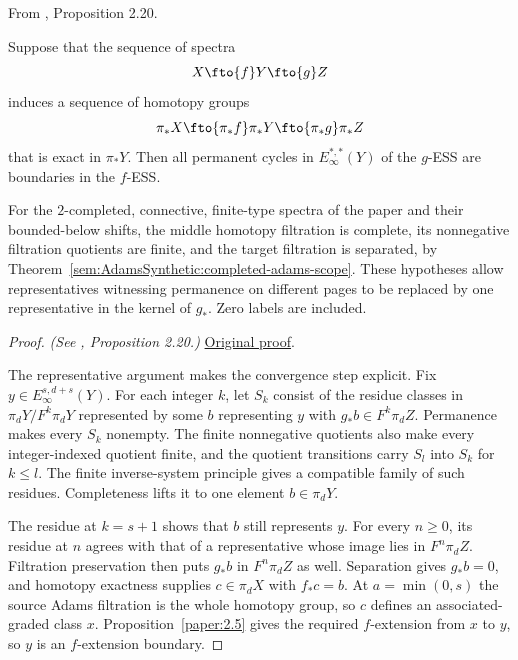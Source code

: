 \begin{proposition}
\label{paper:2.20}
From \cite{LWX126}, Proposition 2.20.\par

\label{prop:cfe810af}
    Suppose that the sequence of spectra
    $$X\fto{f}Y\fto{g}Z$$
    induces a sequence of homotopy groups
    $$\pi_*X\fto{\pi_*f}\pi_*Y\fto{\pi_*g}\pi_*Z$$
    that is exact in $\pi_*Y$. Then all permanent cycles in $E^{*,*}_\infty(Y)$ of the $g$-ESS are boundaries in the $f$-ESS.


For the $2$-completed, connective, finite-type spectra of the paper and
their bounded-below shifts, the middle homotopy filtration is complete,
its nonnegative filtration quotients are finite, and the target
filtration is separated, by
Theorem~\ref{sem:AdamsSynthetic:completed-adams-scope}.
These hypotheses allow representatives witnessing permanence on different
pages to be replaced by one representative in the kernel of $g_*$.
Zero labels are included.
\end{proposition}
\begin{proof}
\textit{(See \cite{LWX126}, Proposition 2.20.)} \href{paper/main.tex.html#L656}{Original proof}.

The representative argument makes the convergence step explicit. Fix
$y\in E_\infty^{s,d+s}(Y)$. For each integer $k$, let $S_k$ consist of the
residue classes in $\pi_dY/F^k\pi_dY$ represented by some $b$ representing
$y$ with $g_*b\in F^k\pi_dZ$. Permanence makes every $S_k$ nonempty.
The finite nonnegative quotients also make every integer-indexed quotient
finite, and the quotient transitions carry $S_l$ into $S_k$ for $k\leq l$.
The finite inverse-system principle gives a compatible family of such
residues. Completeness lifts it to one element $b\in\pi_dY$.

The residue at $k=s+1$ shows that $b$ still represents $y$. For every
$n\geq0$, its residue at $n$ agrees with that of a representative whose
image lies in $F^n\pi_dZ$. Filtration preservation then puts $g_*b$ in
$F^n\pi_dZ$ as well. Separation gives $g_*b=0$, and homotopy exactness
supplies $c\in\pi_dX$ with $f_*c=b$. At $a=\min(0,s)$ the source Adams
filtration is the whole homotopy group, so $c$ defines an
associated-graded class $x$. Proposition~\ref{paper:2.5} gives the required
$f$-extension from $x$ to $y$, so $y$ is an $f$-extension boundary.
\end{proof}

